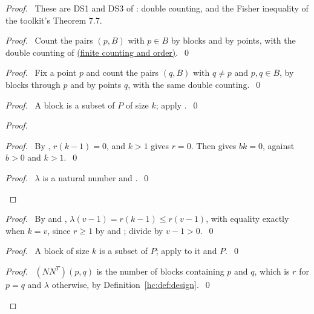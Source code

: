 \begin{proof}
 \pfsketch\ These are DS1 and DS3 of : double counting, and the
 Fisher inequality of the toolkit's Theorem 7.7.
 \begin{proof}\pf\ Count the pairs $(p,B)$ with $p\in B$ by blocks and by points, with the
  double counting of \hyperref[hc:facts:finite]{(finite counting and order)}.~\qed\end{proof}
 \begin{proof}\pf\ Fix a point $p$ and count the pairs $(q,B)$ with $q\ne p$ and $p,q\in B$, by
  blocks through $p$ and by points $q$, with the same double counting.~\qed\end{proof}
 \begin{proof}\pf\ A block is a subset of $P$ of size $k$; apply .~\qed\end{proof}
 \begin{proof}
  \begin{proof}\pf\ By , $r(k-1)=0$, and $k>1$ gives $r=0$. Then
    gives $bk=0$, against $b>0$ and $k>1$.~\qed\end{proof}
  \qedstep
  \begin{proof}\pf\ $\lambda$ is a natural number and .~\qed\end{proof}
 \end{proof}
 \begin{proof}\pf\ By  and ,
  $\lambda(v-1)=r(k-1)\le r(v-1)$, with equality exactly when $k=v$, since $r\ge1$ by
   and ; divide by $v-1>0$.~\qed\end{proof}
 \begin{proof}\pf\ A block of size $k$ is a subset of $P$; apply
   to it and $P$.~\qed\end{proof}
 \begin{proof}\pf\ $(NN^T)(p,q)$ is the number of blocks containing $p$ and $q$, which is $r$
  for $p=q$ and $\lambda$ otherwise, by Definition~\ref{hc:def:design}.~\qed\end{proof}

\end{proof}
